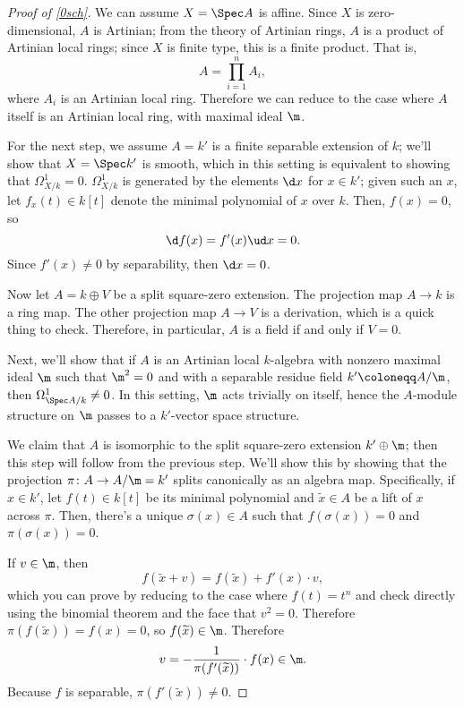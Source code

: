 \begin{proof}[Proof of \cref{0sch}]
We can assume $X = \Spec A$ is affine. Since $X$ is zero-dimensional, $A$ is Artinian; from the theory of Artinian
rings, $A$ is a product of Artinian local rings; since $X$ is finite type, this is a finite product. That is,
\begin{equation}
	A = \prod_{i=1}^n A_i,
\end{equation}
where $A_i$ is an Artinian local ring. Therefore we can reduce to the case where $A$ itself is an Artinian local
ring, with maximal ideal $\m$.

For the next step, we assume $A = k'$ is a finite separable extension of $k$; we'll show that $X = \Spec k'$ is
smooth, which in this setting is equivalent to showing that $\Omega_{X/k}^1 = 0$. $\Omega_{X/k}^1$ is generated by
the elements $\d x$ for $x\in k'$; given such an $x$, let $f_x(t)\in k[t]$ denote the minimal polynomial of $x$
over $k$. Then, $f(x) = 0$, so
\begin{equation}
	\d f(x) = f'(x)\ud x = 0.
\end{equation}
Since $f'(x)\ne 0$ by separability, then $\d x = 0$.

Now let $A = k\oplus V$ be a split square-zero extension. The projection map $A\to k$ is a ring map. The other
projection map $A\to V$ is a derivation, which is a quick thing to check. Therefore, in particular, $A$ is a field
if and only if $V = 0$.

Next, we'll show that if $A$ is an Artinian local $k$-algebra with nonzero maximal ideal $\m$ such that $\m^2 = 0$
and with a separable residue field $k'\coloneqq A/\m$, then $\Omega_{\Spec A/k}^1 \ne 0$. In this setting, $\m$
acts trivially on itself, hence the $A$-module structure on $\m$ passes to a $k'$-vector space structure.

We claim that $A$ is isomorphic to the split square-zero extension $k'\oplus\m$; then this step will follow from
the previous step. We'll show this by showing that the projection $\pi\colon A\to A/\m = k'$ splits canonically as
an algebra map. Specifically, if $x\in k'$, let $f(t)\in k[t]$ be its minimal polynomial and $\widetilde x\in A$ be
a lift of $x$ across $\pi$. Then, there's a unique $\sigma(x)\in A$ such that $f(\sigma(x)) = 0$ and
$\pi(\sigma(x)) = 0$.

If $v\in\m$, then
\begin{equation}
	f(\widetilde x+v) = f(\widetilde x) + f'(x)\cdot v,
\end{equation}
which you can prove by reducing to the case where $f(t) = t^n$ and check directly using the binomial theorem and
the face that $v^2 = 0$. Therefore $\pi(f(\widetilde x)) = f(x) = 0$, so $f(\widetilde x)\in\m$. Therefore
\begin{equation}
	v = -\frac{1}{\pi(f'(\widetilde x))} \cdot f(x)\in\m.
\end{equation}
Because $f$ is separable, $\pi(f'(\widetilde x)) \ne 0$.


\end{proof}

